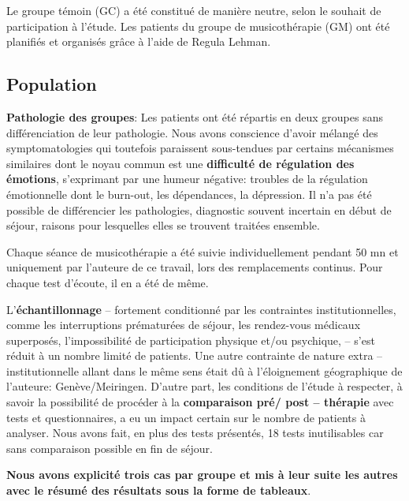   Le groupe témoin (GC) a été constitué de manière neutre, selon le souhait de participation à l'étude. 
 Les patients du groupe de musicothérapie (GM) 
 ont été planifiés et organisés grâce à l'aide de Regula Lehman.
 \subsection{Population}
 
 
 \textbf{ Pathologie des groupes}: Les patients ont été répartis en deux groupes sans différenciation de
 leur pathologie. Nous avons conscience d'avoir mélangé des symptomatologies qui
 toutefois paraissent
 sous-tendues par
 certains mécanismes
 similaires dont le
 noyau commun est une
 \textbf{difficulté de
 	régulation des
 	émotions},
 s'exprimant par une
 humeur négative: 
 troubles de la régulation émotionnelle
 dont le burn-out, les dépendances, la dépression.
 Il n'a pas été
 possible de différencier les pathologies, 
 diagnostic souvent incertain en début de séjour, raisons pour lesquelles elles
 se trouvent traitées ensemble.
 

 Chaque séance de musicothérapie a été suivie individuellement pendant 50 mn et uniquement par 
 l'auteure de ce 
 travail, lors des remplacements continus. Pour chaque test d'écoute, il en a été de même.
 
 
 
 L'\textbf{échantillonnage} -- fortement conditionné par les contraintes
 institutionnelles, comme les interruptions prématurées de séjour, les rendez-vous
 médicaux superposés, l'impossibilité de participation physique et/ou
 psychique,
 -- s'est réduit à un nombre limité de
 patients.
 Une autre contrainte de nature extra -- institutionnelle allant dans le
 même sens était dû à l'éloignement géographique de l'auteure: Genève/Meiringen.
 D'autre part, les conditions de l'étude à respecter, 
 à savoir la possibilité de procéder à la \textbf{ comparaison pré/ post -- thérapie} avec tests et 
 questionnaires, a eu un impact 
 certain sur le nombre de patients à analyser. 
 Nous avons fait, en plus des tests présentés, 18  tests  
 inutilisables car sans comparaison possible en fin de séjour.
 

 
  \textbf{Nous avons explicité trois cas par groupe  et mis à leur suite les autres avec le résumé des 
 résultats 
 sous la forme de tableaux}.
 
